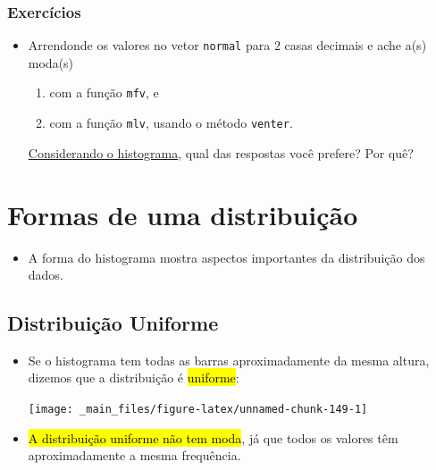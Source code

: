 \documentclass[
  11pt]{report}
\providecommand{\tightlist}{%
  \setlength{\itemsep}{0pt}\setlength{\parskip}{0pt}}
\begin{document}
\hypertarget{exercuxedcios-7}{%
\subsubsection{Exercícios}\label{exercuxedcios-7}}

\begin{itemize}
\item
  Arrendonde os valores no vetor \texttt{normal} para $2$ casas decimais e ache a(s) moda(s)

  \begin{enumerate}
  \def\labelenumi{\arabic{enumi}.}
  \item
    com a função \texttt{mfv}, e
  \item
    com a função \texttt{mlv}, usando o método \texttt{venter}.
  \end{enumerate}

  \protect\hyperlink{dados-normais}{Considerando o histograma}, qual das respostas você prefere? Por quê?
\end{itemize}

\hypertarget{formas-de-uma-distribuiuxe7uxe3o}{%
\section{Formas de uma distribuição}\label{formas-de-uma-distribuiuxe7uxe3o}}

\begin{itemize}
\tightlist
\item
  A forma do histograma mostra aspectos importantes da distribuição dos dados.
\end{itemize}

\hypertarget{distribuiuxe7uxe3o-uniforme}{%
\subsection{Distribuição Uniforme}\label{distribuiuxe7uxe3o-uniforme}}

\begin{itemize}
\item
  Se o histograma tem todas as barras aproximadamente da mesma altura, dizemos que a distribuição é {\hl{uniforme}}:

  \begin{center}\texttt{[image: \_main\_files/figure-latex/unnamed-chunk-149-1]} \end{center}
\item
  {\hl{A distribuição uniforme não tem moda}}, já que todos os valores têm aproximadamente a mesma frequência.
\end{itemize}
\end{document}
